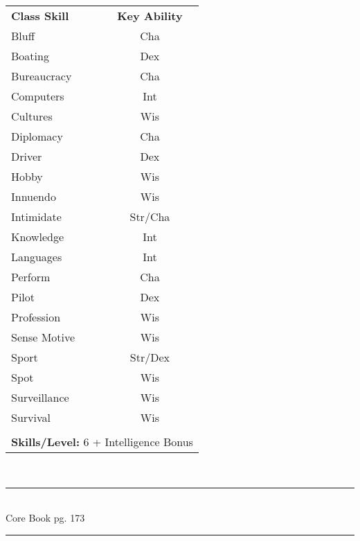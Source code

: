 \begin{table}[htb]
\raggedright
\begin{tabular}{l c}
\textbf{Class Skill} & \textbf{Key Ability}\\

Bluff & Cha\\
Boating & Dex\\
Bureaucracy & Cha\\
Computers & Int\\
Cultures & Wis\\
Diplomacy & Cha\\
Driver & Dex\\
Hobby & Wis\\
Innuendo & Wis\\
Intimidate & Str/Cha\\
Knowledge & Int\\
Languages & Int\\
Perform & Cha\\
Pilot & Dex\\
Profession & Wis\\
Sense Motive & Wis\\
Sport & Str/Dex\\
Spot & Wis\\
Surveillance & Wis\\
Survival & Wis\\


\multicolumn{2}{l}{\cellcolor{white}}\\
\multicolumn{2}{l}{\cellcolor{white}\textbf{Skills/Level:} 6 + Intelligence Bonus}\\
\end{tabular}
\end{table}

\setlength{\intextsep}{14.0pt plus 4.0pt minus 4.0pt}

\vspace*{3cm}

\vspace*{\fill}

\begin{center}
\textsc{\Large}\\[0.25cm]
\rule{\linewidth}{0.5mm}\\[0.6cm]
\fontsize{30}{30} \selectfont Core Book pg. 173\\
\rule{\linewidth}{0.5mm}\\[0.6cm]
\vfill
\end{center}

\pagebreak




